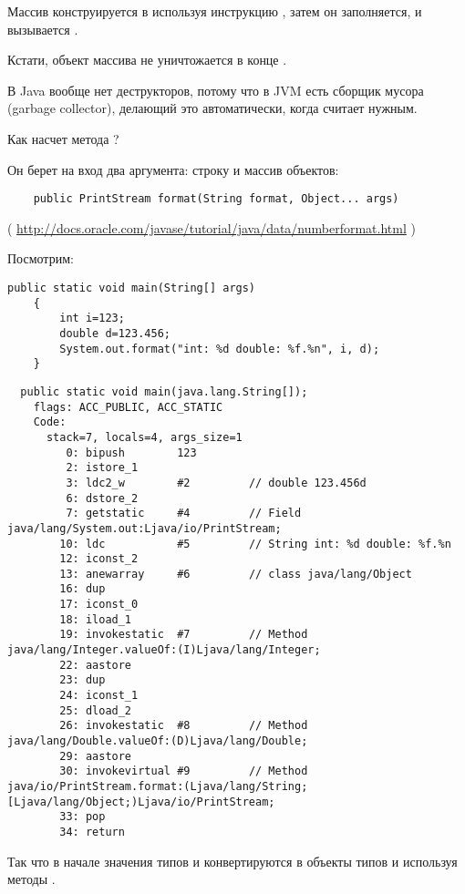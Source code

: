 Массив конструируется в \main используя инструкцию , 
затем он заполняется, и вызывается \ttf.


Кстати, объект массива не уничтожается в конце \main.

В Java вообще нет деструкторов, потому что в JVM есть сборщик мусора (garbage collector),
делающий это автоматически, когда считает нужным.


Как насчет метода ?

Он берет на вход два аргумента: строку и массив объектов:

\begin{lstlisting}
	public PrintStream format(String format, Object... args)
\end{lstlisting}
( \url{http://docs.oracle.com/javase/tutorial/java/data/numberformat.html} )

Посмотрим:

\begin{lstlisting}[style=customjava]
	public static void main(String[] args)
	{
		int i=123;
		double d=123.456;
		System.out.format("int: %d double: %f.%n", i, d);
	}
\end{lstlisting}

\begin{lstlisting}
  public static void main(java.lang.String[]);
    flags: ACC_PUBLIC, ACC_STATIC
    Code:
      stack=7, locals=4, args_size=1
         0: bipush        123
         2: istore_1      
         3: ldc2_w        #2         // double 123.456d
         6: dstore_2      
         7: getstatic     #4         // Field java/lang/System.out:Ljava/io/PrintStream;
        10: ldc           #5         // String int: %d double: %f.%n
        12: iconst_2      
        13: anewarray     #6         // class java/lang/Object
        16: dup           
        17: iconst_0      
        18: iload_1       
        19: invokestatic  #7         // Method java/lang/Integer.valueOf:(I)Ljava/lang/Integer;
        22: aastore       
        23: dup           
        24: iconst_1      
        25: dload_2       
        26: invokestatic  #8         // Method java/lang/Double.valueOf:(D)Ljava/lang/Double;
        29: aastore       
        30: invokevirtual #9         // Method java/io/PrintStream.format:(Ljava/lang/String;[Ljava/lang/Object;)Ljava/io/PrintStream;
        33: pop           
        34: return        
\end{lstlisting}


Так что в начале значения типов  и  конвертируются в объекты типов 
 и  используя методы .

